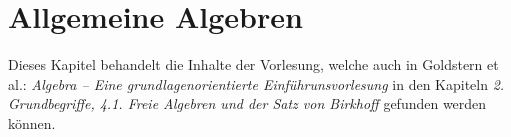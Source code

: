 \chapter{Allgemeine Algebren}

Dieses Kapitel behandelt die Inhalte der Vorlesung, welche auch in Goldstern et al.: \textit{Algebra -- Eine grundlagenorientierte Einführunsvorlesung} in den Kapiteln \textit{2. Grundbegriffe, 4.1. Freie Algebren und der Satz von Birkhoff} gefunden werden können.





